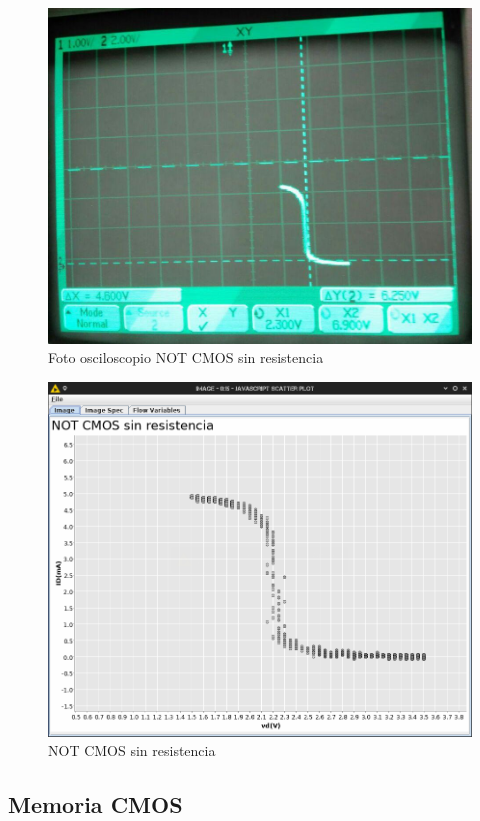 \documentclass[paper=a4, fontsize=11pt]{scrartcl} %
\numberwithin{equation}{section} %
\numberwithin{figure}{section} %
\numberwithin{table}{section} %
\begin{document}
\begin{figure}[H]
	\centering
	\includegraphics[scale=0.4]{image/cmos-sinres}
	\caption{Foto osciloscopio NOT CMOS sin resistencia}
	\label{fig:prac-5b-img3}
\end{figure}

\begin{figure}[H]
	\centering
	\includegraphics[scale=0.27]{image/NOTp5b}
	\caption{NOT CMOS sin resistencia}
	\label{fig:prac-5b-img3s}
\end{figure}


\subsection{Memoria CMOS \cite{RV}}
\end{document}

